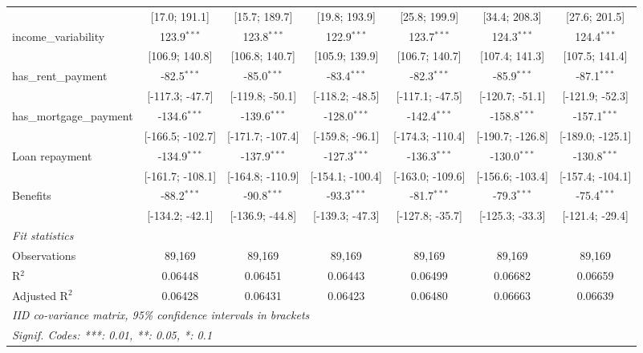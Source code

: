 \begin{table}[htbp]
\begin{threeparttable}[b]
\begin{tabular}{lcccccc}
                                   & [17.0; 191.1]    & [15.7; 189.7]    & [19.8; 193.9]    & [25.8; 199.9]    & [34.4; 208.3]    & [27.6; 201.5]\\   
         income\_variability       & 123.9$^{***}$    & 123.8$^{***}$    & 122.9$^{***}$    & 123.7$^{***}$    & 124.3$^{***}$    & 124.4$^{***}$\\   
                                   & [106.9; 140.8]   & [106.8; 140.7]   & [105.9; 139.9]   & [106.7; 140.7]   & [107.4; 141.3]   & [107.5; 141.4]\\   
         has\_rent\_payment        & -82.5$^{***}$    & -85.0$^{***}$    & -83.4$^{***}$    & -82.3$^{***}$    & -85.9$^{***}$    & -87.1$^{***}$\\   
                                   & [-117.3; -47.7]  & [-119.8; -50.1]  & [-118.2; -48.5]  & [-117.1; -47.5]  & [-120.7; -51.1]  & [-121.9; -52.3]\\   
         has\_mortgage\_payment    & -134.6$^{***}$   & -139.6$^{***}$   & -128.0$^{***}$   & -142.4$^{***}$   & -158.8$^{***}$   & -157.1$^{***}$\\   
                                   & [-166.5; -102.7] & [-171.7; -107.4] & [-159.8; -96.1]  & [-174.3; -110.4] & [-190.7; -126.8] & [-189.0; -125.1]\\   
         Loan repayment            & -134.9$^{***}$   & -137.9$^{***}$   & -127.3$^{***}$   & -136.3$^{***}$   & -130.0$^{***}$   & -130.8$^{***}$\\   
                                   & [-161.7; -108.1] & [-164.8; -110.9] & [-154.1; -100.4] & [-163.0; -109.6] & [-156.6; -103.4] & [-157.4; -104.1]\\   
         Benefits                  & -88.2$^{***}$    & -90.8$^{***}$    & -93.3$^{***}$    & -81.7$^{***}$    & -79.3$^{***}$    & -75.4$^{***}$\\   
                                   & [-134.2; -42.1]  & [-136.9; -44.8]  & [-139.3; -47.3]  & [-127.8; -35.7]  & [-125.3; -33.3]  & [-121.4; -29.4]\\   
         \midrule
         \emph{Fit statistics}\\
         Observations              & 89,169           & 89,169           & 89,169           & 89,169           & 89,169           & 89,169\\  
         R$^2$                     & 0.06448          & 0.06451          & 0.06443          & 0.06499          & 0.06682          & 0.06659\\  
         Adjusted R$^2$            & 0.06428          & 0.06431          & 0.06423          & 0.06480          & 0.06663          & 0.06639\\  
         \midrule \midrule
         \multicolumn{7}{l}{\emph{IID co-variance matrix, 95\% confidence intervals in brackets}}\\
         \multicolumn{7}{l}{\emph{Signif. Codes: ***: 0.01, **: 0.05, *: 0.1}}\\
      \end{tabular}
      

\end{threeparttable}
\end{table}
